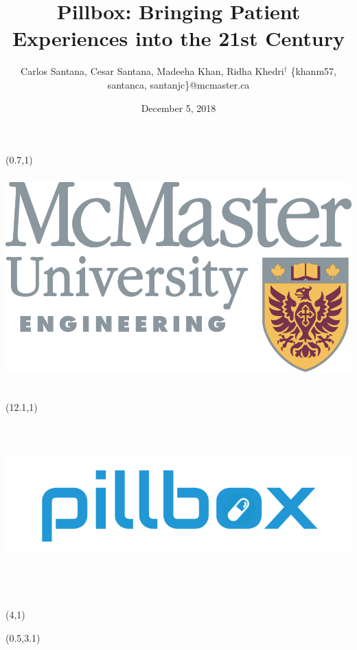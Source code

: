 \documentclass[22pt]{beamer}
\title{Pillbox: Bringing Patient Experiences into the 21st Century}
\author[Santana, Santana, Khan \& Khedri]{Carlos Santana, Cesar Santana, Madeeha Khan, Ridha Khedri$^\dagger$ \vspace{0.3cm} \newline \small \{khanm57, santanca, santanjc\}@mcmaster.ca}
\institute[McMaster University]{$^\dagger$Department of Computing and Software, McMaster University}
\date{December 5, 2018}
\begin{document}

\begin{frame}[fragile]

\begin{textblock}{2}(0.7,1)
\includegraphics[height=8.5cm]{englogo.png} %
\end{textblock}

\begin{textblock}{2}(12.1,1)
\includegraphics[height=7cm, width=20cm]{pillbox_logo.png}
\end{textblock}

\begin{textblock}{8}(4,1)
\titlepage
\end{textblock}

\begin{textblock}{7.25}(0.5,3.1)


\end{textblock}
\end{frame}
\end{document}
